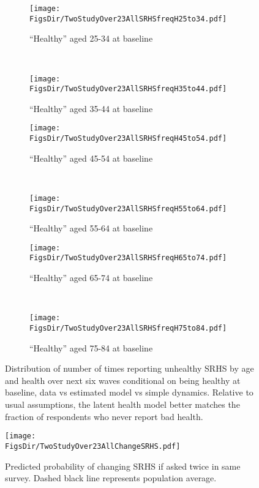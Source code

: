 \documentclass[12pt,pdftex,letterpaper]{article}
\newcommand{\RootDir}{..}
\newcommand{\FigsDir}{\RootDir/Figures}
\begin{document}
\begin{figure}
	\centering
	\begin{subfigure}[b]{0.48\textwidth}
		\texttt{[image: \\FigsDir/TwoStudyOver23AllSRHSfreqH25to34.pdf]}
		\caption{``Healthy'' aged 25-34 at baseline}\label{fig:SRHSfreqH25to34}
	\end{subfigure}
	~
	\begin{subfigure}[b]{0.48\textwidth}
		\texttt{[image: \\FigsDir/TwoStudyOver23AllSRHSfreqH35to44.pdf]}
		\caption{``Healthy'' aged 35-44 at baseline}\label{fig:SRHSfreqH35to44}
	\end{subfigure}
	
	\begin{subfigure}[b]{0.48\textwidth}
		\texttt{[image: \\FigsDir/TwoStudyOver23AllSRHSfreqH45to54.pdf]}
		\caption{``Healthy'' aged 45-54 at baseline}\label{fig:SRHSfreqH45to54}
	\end{subfigure}
	~
	\begin{subfigure}[b]{0.48\textwidth}
		\texttt{[image: \\FigsDir/TwoStudyOver23AllSRHSfreqH55to64.pdf]}
		\caption{``Healthy'' aged 55-64 at baseline}\label{fig:SRHSfreqH55to64}
	\end{subfigure}
	
	
	\begin{subfigure}[b]{0.48\textwidth}
		\texttt{[image: \\FigsDir/TwoStudyOver23AllSRHSfreqH65to74.pdf]}
		\caption{``Healthy'' aged 65-74 at baseline}\label{fig:SRHSfreqH65to74}
	\end{subfigure}
	~
	\begin{subfigure}[b]{0.48\textwidth}
		\texttt{[image: \\FigsDir/TwoStudyOver23AllSRHSfreqH75to84.pdf]}
		\caption{``Healthy'' aged 75-84 at baseline}\label{fig:SRHSfreqH75to84}
	\end{subfigure}
	\caption{Distribution of number of times reporting unhealthy SRHS by age and health over next six waves conditional on being healthy at baseline, data vs estimated model vs simple dynamics. Relative to usual assumptions, the latent health model better matches the fraction of respondents who never report bad health.}\label{fig:SRHSfreqHTwoStudy}
\end{figure}

\begin{figure}
	\centering
	\texttt{[image: \\FigsDir/TwoStudyOver23AllChangeSRHS.pdf]}
	\caption{Predicted probability of changing SRHS if asked twice in same survey. Dashed black line represents population average.}\label{fig:ChangeSRHS}
\end{figure}

\newpage



\end{document}
